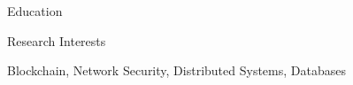 \documentclass{resume} %
\begin{document}
\begin{rSection}{Education}





\end{rSection}


\begin{rSection}{Research Interests}

Blockchain, Network Security, Distributed Systems, Databases

\end{rSection}
\end{document}

